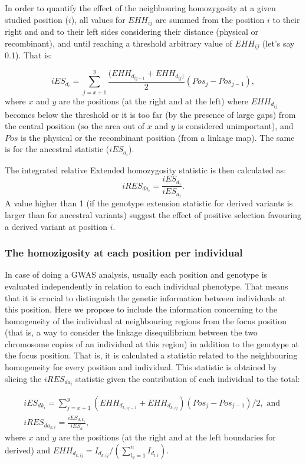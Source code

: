\documentclass[a4paper,11pt]{article}
\begin{document}
In order to quantify the effect of the neighbouring homozygosity at a given studied position ($i$),  all values for $EHH_{ij}$ are summed from the position $i$ to their right and and to their left sides considering their distance (physical or recombinant), and until reaching a threshold arbitrary value of $EHH_{ij}$ (let's say 0.1). That is: 

\begin{equation}
 iES_{d_i} = \sum_{j=x+1}^{y}\frac{(EHH_{d_{ij-1}} + EHH_{d_{ij})}}{2} (Pos_{j} - Pos_{j-1}),
 \end{equation}
where $x$ and $y$ are the positions (at the right and at the left) where $EHH_{d_{ij}}$ becomes below the threshold or it is too far (by the presence of large gaps) from the central position (so the area out of $x$ and $y$ is considered unimportant), and $Pos$ is the physical or the recombinant position (from a linkage map). The same is for the ancestral statistic ($iES_{a_i}$).

The integrated relative Extended homozygosity statistic is then calculated as:
 \begin{equation}
 iRES_{da_{i}} = \frac{iES_{d_{i}}} {iES_{a_{i}}}.
 \end{equation}
A value higher than 1 (if the genotype extension statistic for derived variants is larger than for ancestral variants) suggest the effect of positive selection favouring a derived variant at position $i$.  

\subsubsection{The homozigosity at each position per individual}
In case of doing a GWAS analysis, usually each position and genotype is evaluated independently in relation to each individual phenotype. That means that it is crucial to distinguish the genetic information between individuals at this position. Here we propose to include the information concerning to the homogeneity of the individual at neighbouring regions from the focus position (that is, a way to consider the linkage disequilibrium between the two chromosome copies of an individual at this region) in addition to the genotype at the focus position. That is, it is calculated a statistic related to the neighbouring homogeneity for every position and individual. This statistic is obtained by slicing the $iRES_{da_i}$ statistic given the contribution of each individual to the total:

\begin{equation}
\begin{split}
iES_{dk_i} = \sum_{j=x+1}^{y}(EHH_{d_{k,ij-1}}+ EHH_{d_{k,ij}})(Pos_{j} - Pos_{j-1}) / 2, \text{ and }\\ 
iRES_{da_{k,i}} =  \frac{iES_{d,k_i}}{iES_{a}},
\end{split}
\end{equation}
where $x$ and $y$ are the positions (at the right and at the left boundaries for derived) and $EHH_{d_{k,ij}} = I_{d_{k,ij}} / (\sum_{l_d=1}^{n}I_{d_{l,i}})$. 
\end{document}
